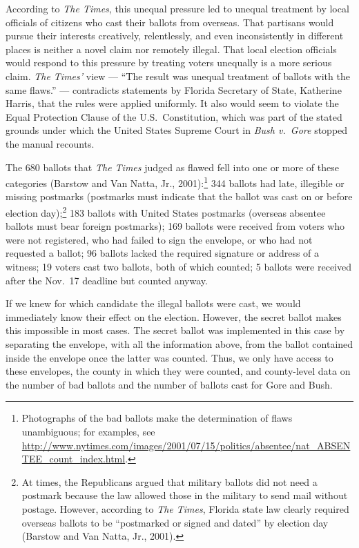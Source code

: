\documentclass[11pt,titlepage]{article}
\begin{document}
According to \emph{The Times}, this unequal pressure led to unequal
treatment by local officials of citizens who cast their ballots from
overseas.  That partisans would pursue their interests creatively,
relentlessly, and even inconsistently in different places is neither a
novel claim nor remotely illegal.  That local election officials would
respond to this pressure by treating voters unequally is a more
serious claim. \emph{The Times'} view --- ``The result was unequal
treatment of ballots with the same flaws.'' --- contradicts statements
by Florida Secretary of State, Katherine Harris, that the rules were
applied uniformly.  It also would seem to violate the Equal Protection
Clause of the U.S.\ Constitution, which was part of the stated grounds
under which the United States Supreme Court in \emph{Bush v.\ Gore}
stopped the manual recounts.

The 680 ballots that \emph{The Times} judged as flawed fell into one
or more of these categories (Barstow and Van Natta, Jr.,
2001):\footnote{Photographs of the bad ballots make the determination
  of flaws unambiguous; for examples, see
  \url{http://www.nytimes.com/images/2001/07/15/politics/absentee/nat_ABSENTEE_count_index.html}.}
344 ballots had late, illegible or missing postmarks (postmarks must
indicate that the ballot was cast on or before election
day);\footnote{At times, the Republicans argued that military ballots
  did not need a postmark because the law allowed those in the
  military to send mail without postage.  However, according to
  \emph{The Times}, Florida state law clearly required overseas
  ballots to be ``postmarked or signed and dated'' by election day
  (Barstow and Van Natta, Jr., 2001).}  183 ballots with United States
postmarks (overseas absentee ballots must bear foreign postmarks); 169
ballots were received from voters who were not registered, who had
failed to sign the envelope, or who had not requested a ballot; 96
ballots lacked the required signature or address of a witness; 19
voters cast two ballots, both of which counted; 5 ballots were
received after the Nov.\ 17 deadline but counted anyway.

If we knew for which candidate the illegal ballots were cast, we would
immediately know their effect on the election. However, the secret
ballot makes this impossible in most cases.  The secret ballot was
implemented in this case by separating the envelope, with all the
information above, from the ballot contained inside the envelope once
the latter was counted.  Thus, we only have access to these envelopes,
the county in which they were counted, and county-level data on the
number of bad ballots and the number of ballots cast for Gore and
Bush.
\end{document}
